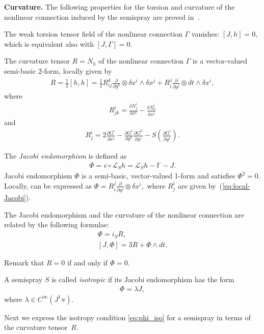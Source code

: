 \documentclass[pdftex]{sigma}
\begin{document}
{\bf Curvature.}
The following properties for the torsion and curvature of the nonlinear
connection induced by the semispray are proved in~\cite{B-C-2010}.

The weak torsion tensor f\/ield of the nonlinear connection $\Gamma$
vanishes: $[J,h]=0,$ which is equivalent also with $[J,\Gamma]=0$.

The curvature tensor $R=N_{h}$ of the nonlinear connection $\Gamma$
is a vector-valued semi-basic 2-form, locally given by
\begin{gather}
R=\frac{1}{2}[h,h]=\frac{1}{2}R_{ij}^{k}\frac{\partial}{\partial y^{k}}\otimes\delta x^{i}\wedge\delta x^{j}+R_{i}^{j}\frac{\partial}{\partial y^{j}}\otimes dt\wedge\delta x^{i},\label{eq:19}
\end{gather}
 where \begin{gather*}
R_{jk}^{i}=\frac{\delta N_{j}^{i}}{\delta x^{k}}-\frac{\delta N_{k}^{i}}{\delta x^{j}}%
\end{gather*}
 and \begin{gather}
R_{j}^{i}=2\frac{\partial G^{i}}{\partial x^{j}}-\frac{\partial G^{i}}{\partial y^{k}}\frac{\partial G^{k}}{\partial y^{j}}-S\left(\frac{\partial G^{i}}{\partial y^{j}}\right).\label{eq:local-Jacobi}
\end{gather}


The \emph{Jacobi endomorphism} is def\/ined as \begin{gather}
\Phi=v\circ\mathcal{L}_{S}h=\mathcal{L}_{S}h-\mathbb{F}-J.\label{eq:22}\end{gather}
 Jacobi endomorphism $\Phi$ is a semi-basic, vector-valued 1-form
and satisf\/ies $\Phi^{2}=0$. Locally, can be expressed as $\Phi=R_{i}^{j}\frac{\partial}{\partial y^{j}}\otimes\delta x^{i},$
where $R_{j}^{i}$ are given by~(\ref{eq:local-Jacobi}).

The Jacobi endomorphism and the curvature of the nonlinear connection
are related by the following formulae:
\begin{gather}
\Phi   =   i_{S}R,\label{eq:23'}\\
\left[J,\Phi\right]   =   3R+\Phi\wedge dt.\label{eq:24'}
\end{gather}


Remark that $R=0$ if and only if $\Phi=0$.

\begin{definition}
A semispray $S$ is called \emph{isotropic} if its Jacobi endomorphism
has the form \begin{gather}
\Phi=\lambda J,
\label{eq:phi_iso}
\end{gather}
 where $\lambda\in C^{\infty}(J^{1}\pi)$.
\end{definition}
Next we express the isotropy condition \eqref{eq:phi_iso} for a semispray
in terms of the curvature tensor~$R$.
\end{document}
